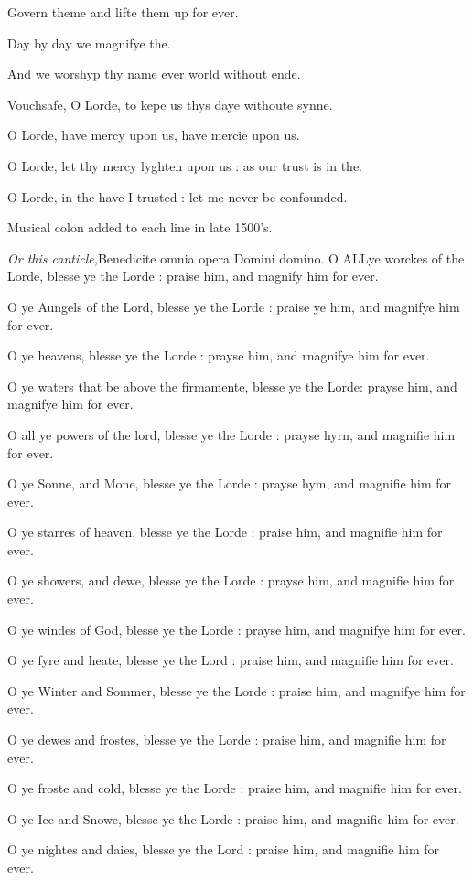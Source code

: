Govern theme and lifte them up for ever.

Day by day we magnifye the.

And we worshyp thy name ever world without ende.

Vouchsafe, O Lorde, to kepe us thys daye withoute synne.

O Lorde, have mercy upon us, have mercie upon us.

O Lorde, let thy mercy lyghten upon us : as our
trust is in the.

O Lorde, in the have I trusted : let me never be confounded.

Musical
colon added to each line in late 1500's.

\emph{Or
this canticle,}Benedicite omnia opera Domini domino.
O ALL\textbf{}ye worckes of the Lorde, blesse ye the Lorde : praise him, and magnify
him for ever. 

O ye Aungels of the Lord, blesse ye the Lorde :
praise ye him, and magnifye him for ever. 

O ye heavens, blesse ye the Lorde : prayse him,
and rnagnifye him for ever. 

O ye waters that be above the firmamente, blesse
ye the Lorde: prayse him, and magnifye him for ever. 

O all ye powers of the lord, blesse ye the Lorde
: prayse hyrn, and magnifie him for ever. 

O ye Sonne, and Mone, blesse ye the Lorde : prayse
hym, and magnifie him for ever. 

O ye starres of heaven, blesse ye the Lorde : praise
him, and magnifie him for ever. 

O ye showers, and dewe, blesse ye the Lorde : prayse
him, and magnifie him for ever. 

O ye windes of God, blesse ye the Lorde : prayse
him, and magnifye him for ever. 

O ye fyre and heate, blesse ye the Lord : praise
him, and magnifie him for ever. 

O ye Winter and Sommer, blesse ye the Lorde : praise
him, and magnifye him for ever. 

O ye dewes and frostes, blesse ye the Lorde : praise
him, and magnifie him for ever. 

O ye froste and cold, blesse ye the Lorde : praise
him, and magnifie him for ever. 

O ye Ice and Snowe, blesse ye the Lorde : praise him,
and magnifie him for ever. 

O ye nightes and daies, blesse ye the Lord : praise
him, and magnifie him for ever. 

